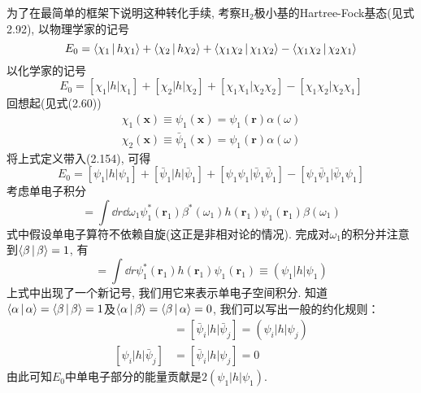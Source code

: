 为了在最简单的框架下说明这种转化手续, 考察$\mathrm{H}_2$极小基的Hartree-Fock基态(见式2.92), 以物理学家的记号
\begin{equation}
E_0 = \Braket{\chi_1|h\chi_1} + \Braket{\chi_2|h\chi_2} + \Braket{\chi_1\chi_2|\chi_1\chi_2} - \Braket{\chi_1\chi_2|\chi_2\chi_1}
\end{equation}
以化学家的记号
\begin{equation}
E_0 = [{\chi_1|h|\chi_1}] + [{\chi_2|h|\chi_2}] + [{\chi_1\chi_1|\chi_2\chi_2}] - [{\chi_1\chi_2|\chi_2\chi_1}]
\end{equation}
回想起(见式(2.60))
\begin{align}
\chi_1(\mathbf{x})\equiv \psi_1(\mathbf{x}) = \psi_1(\mathbf{\mathbf{r}})\alpha(\omega)\\
\chi_2(\mathbf{x})\equiv \bar{\psi}_1(\mathbf{x}) = \psi_1(\mathbf{\mathbf{r}})\alpha(\omega)
\end{align}
将上式定义带入(2.154), 可得
\begin{equation}
E_0 = [{\psi_1|h|\psi_1}] + [{\bar{\psi}_1|h|\bar{\psi}_1}] + [{\psi_1\psi_1|\bar{\psi}_1\bar{\psi}_1}] - [{\psi_1\bar{\psi}_1|\bar{\psi}_1\psi_1}]
\end{equation}
考虑单电子积分
\begin{equation}
[\bar{\psi}_1|h|\bar{\psi}_1] = \int\dd{r}\dd\omega_1\psi_1^*(\mathbf{r}_1)\beta^*(\omega_1)h(\mathbf{r}_1)\psi_1(\mathbf{r}_1)\beta(\omega_1)
\end{equation}
式中假设单电子算符不依赖自旋(这正是非相对论\ha 的情况). 完成对$\omega_1$的积分并注意到$\Braket{\beta|\beta}=1$, 有
\begin{equation}
[\bar{\psi}_1|h|\bar{\psi}_1] =\int\dd{r}\psi_1^*(\mathbf{r}_1)h(\mathbf{r}_1)\psi_1(\mathbf{r}_1) \equiv (\psi_1|h|\psi_1)
\end{equation}
上式中出现了一个新记号, 我们用它来表示单电子空间积分. 知道$\Braket{\alpha|\alpha}=\Braket{\beta|\beta}=1$及$\Braket{\alpha|\beta}=\Braket{\beta|\alpha}=0$, 我们可以写出一般的约化规则：
\begin{align}
[{\psi}_i|h|{\psi}_j] & = [\bar{\psi}_i|h|\bar{\psi}_j] = (\psi_i|h|\psi_j)\\
[{\psi}_i|h|\bar{\psi}_j] & = [\bar{\psi}_i|h|\psi_j] = 0 
\end{align}
由此可知$E_0$中单电子部分的能量贡献是$2(\psi_1|h|\psi_1)$.


